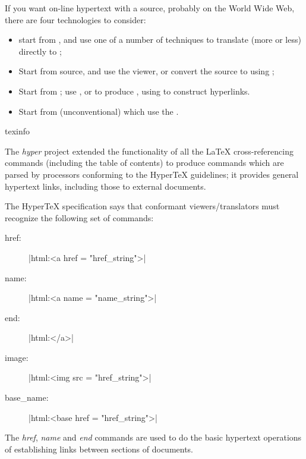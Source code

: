 If you want on-line hypertext with a \AllTeX{} source, probably on the
World Wide Web, there are four technologies to consider:
\begin{itemize}
\item start from \alltex{}, and use one of a number of techniques to
  translate (more or less) directly to
  ;
\item Start from  source,
  and use the  viewer, or convert the 
  source to  using ;
\item Start from \alltex{}; use \pdftex{}, \xetex{} or \luatex{} to
  produce , using  to construct
  hyperlinks.
\item Start from (unconventional) \alltex{} which use the %
  .
\end{itemize}
\begin{ctanrefs}
\item[texinfo]
\end{ctanrefs}


The \emph{hyper\tex{}} project extended the functionality of all the
\LaTeX{} cross-referencing commands (including the table of contents)
to produce  commands which are parsed by  processors
conforming to the Hyper\TeX{} guidelines;
it provides general hypertext links, including those
to external documents.

The Hyper\TeX{} specification says that conformant viewers/translators
must recognize the following set of  commands:
\begin{description}
\item[href:] |html:<a href = "href_string">|
\item[name:] |html:<a name = "name_string">|
\item[end:] |html:</a>|
\item[image:] |html:<img src = "href_string">|
\item[base\_name:] |html:<base href = "href_string">|
\end{description}

The \emph{href}, \emph{name} and \emph{end} commands are used to do
the basic hypertext operations of establishing links between sections
of documents. 

